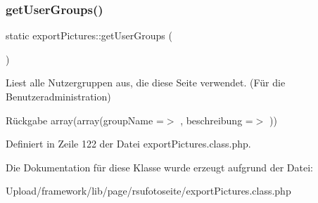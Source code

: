 \subsubsection{\texorpdfstring{get\+User\+Groups()}{getUserGroups()}}
{\footnotesize\ttfamily static export\+Pictures\+::get\+User\+Groups (\begin{DoxyParamCaption}{ }\end{DoxyParamCaption})\hspace{0.3cm}{\ttfamily [static]}}

Liest alle Nutzergruppen aus, die diese Seite verwendet. (Für die Benutzeradministration) \begin{DoxyReturn}{Rückgabe}
array(array(\textquotesingle{}group\+Name\textquotesingle{} =$>$ \textquotesingle{}\textquotesingle{}, \textquotesingle{}beschreibung\textquotesingle{} =$>$ \textquotesingle{}\textquotesingle{})) 
\end{DoxyReturn}


Definiert in Zeile 122 der Datei export\+Pictures.\+class.\+php.



Die Dokumentation für diese Klasse wurde erzeugt aufgrund der Datei\+:\begin{DoxyCompactItemize}
\item 
Upload/framework/lib/page/rsufotoseite/export\+Pictures.\+class.\+php\end{DoxyCompactItemize}
